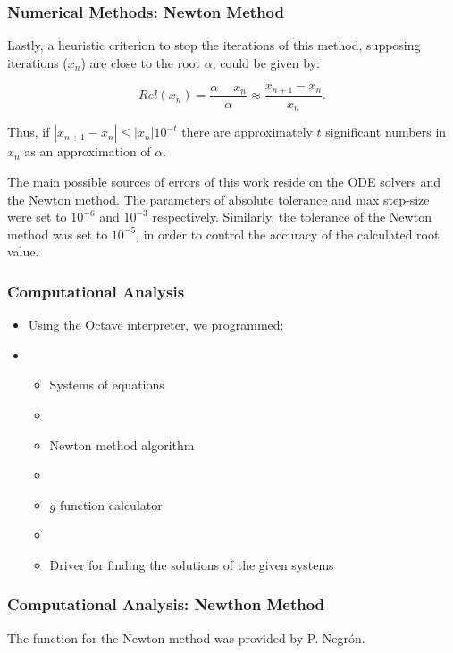\documentclass{beamer}
\begin{document}
 \begin{frame}
\frametitle{Numerical Methods: Newton Method}
    Lastly, a heuristic criterion to stop the iterations of this method, supposing iterations ($x_n$) are close to the root $\alpha$, could be given by:
    
        \begin{equation}\label{22}
            Rel(x_n) = \frac{\alpha - x_n}{\alpha} \approx \frac{x_{n+1} - x_n}{x_n}.
        \end{equation}
    
    Thus, if $|x_{n+1} - x_n| \leq |x_n|10^{-t}$ there are approximately $t$ significant numbers in $x_n$ as an approximation of $\alpha$. \newline
    
    The main possible sources of errors of this work reside on the ODE solvers and the Newton method. The parameters of absolute tolerance and max step-size were set to $10^{-6}$ and $10^{-3}$ respectively. Similarly, the tolerance of the Newton method was set to $10^{-5}$, in order to control the accuracy of the calculated root value. 
\end{frame}

\begin{frame}
\frametitle{Computational Analysis} %
\begin{itemize}
    \item Using the Octave interpreter, we programmed:
    \item[]
    \begin{itemize}
        \item Systems of equations
        \item[]
        \item Newton method algorithm
        \item[]
        \item $g$ function calculator
        \item[]
        \item Driver for finding the solutions of the given systems
    \end{itemize}
\end{itemize}
\end{frame}

\begin{frame}[fragile]
\frametitle{Computational Analysis: Newthon Method} %
The function for the Newton method was provided by P. Negr\'{o}n.
\end{frame}
\end{document}
